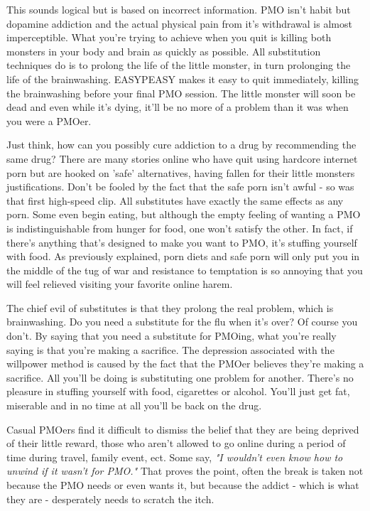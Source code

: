 \documentclass[easypeasy.tex]{subfiles}
\begin{document}
This sounds logical but is based on incorrect information. PMO isn't habit but dopamine addiction and the actual physical pain from it's withdrawal is almost imperceptible. What you're trying to achieve when you quit is killing both monsters in your body and brain as quickly as possible. All substitution techniques do is to prolong the life of the little monster, in turn prolonging the life of the brainwashing. EASYPEASY makes it easy to quit immediately, killing the brainwashing before your final PMO session. The little monster will soon be dead and even while it's dying, it'll be no more of a problem than it was when you were a PMOer.

Just think, how can you possibly cure addiction to a drug by recommending the same drug? There are many stories online who have quit using hardcore internet porn but are hooked on 'safe' alternatives, having fallen for their little monsters justifications. Don't be fooled by the fact that the safe porn isn't awful - so was that first high-speed clip. All substitutes have exactly the same effects as any porn. Some even begin eating, but although the empty feeling of wanting a PMO is indistinguishable from hunger for food, one won't satisfy the other. In fact, if there's anything that's designed to make you want to PMO, it's stuffing yourself with food. As previously explained, porn diets and safe porn will only put you in the middle of the tug of war and resistance to temptation is so annoying that you will feel relieved visiting your favorite online harem.

The chief evil of substitutes is that they prolong the real problem, which is brainwashing. Do you need a substitute for the flu when it's over? Of course you don't. By saying that you need a substitute for PMOing, what you're really saying is that you're making a sacrifice. The depression associated with the willpower method is caused by the fact that the PMOer believes they're making a sacrifice. All you'll be doing is substituting one problem for another. There's no pleasure in stuffing yourself with food, cigarettes or alcohol. You'll just get fat, miserable and in no time at all you'll be back on the drug.

Casual PMOers find it difficult to dismiss the belief that they are being deprived of their little reward, those who aren't allowed to go online during a period of time during travel, family event, ect. Some say, \textit{"I wouldn't even know how to unwind if it wasn't for PMO."} That proves the point, often the break is taken not because the PMO needs or even wants it, but because the addict - which is what they are - desperately needs to scratch the itch.
\end{document}
